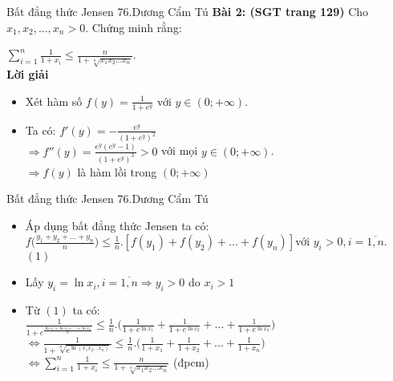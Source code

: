 \begin{frame}{{Bất đẳng thức Jensen} \hspace{6.5cm} 76.Dương Cẩm Tú} 
\textbf{Bài 2: (SGT trang 129)} Cho $x_1,x_2,...,x_n>0$. Chứng minh rằng:\\
\begin{center}
     $\displaystyle \sum_{i=1}^{n} \frac{1}{1+x_i}\leq \frac{n}{1+\sqrt[n]{x_1x_2...x_n}}$.\\
    \pause
    \textbf{Lời giải}\\
\end{center}
\begin{itemize}

    \item Xét hàm số $f(y)=\displaystyle\frac{1}{1+e^y}$ với $y\in (0;+\infty)$.\\
\pause
\vspace{0,25cm}
    \item Ta có: $f'(y)=-\displaystyle\frac{e^y}{(1+e^y)^2}$\\
\pause
\vspace{0,25cm}
    $\Rightarrow \displaystyle f''(y)=\frac{e^y(e^y-1)}{(1+e^y)^3}>0$ với mọi $y\in(0;+\infty)$.\\
\pause
\vspace{0,25cm}
$\Rightarrow \displaystyle f(y)$ là hàm lồi trong $(0;+\infty)$\\

\end{itemize}
\end{frame}
\begin{frame}{{Bất đẳng thức Jensen} \hspace{6.5cm} 76.Dương Cẩm Tú} 
\begin{itemize}
 \item Áp dụng bất đẳng thức Jensen ta có:\\
\pause
\vspace{0,25cm}
 $\displaystyle f\Big( \frac{y_1+y_2+...+y_n}{n}\Big) \leq \frac{1}{n}. [f(y_1)+f(y_2)+...+f(y_n)]$với $y_i>0, i= \overline{1,n}$. $(1)$\\
\item Lấy $y_i=\ln{x_i},i= \overline{1,n} \Rightarrow y_i>0$ do $x_i>1$\\ 
 \item Từ $(1)$ ta có:\\
\pause
\vspace{0,25cm}
$\displaystyle\frac{1}{1+e^{\frac{\ln{x_1}+\ln{x_2}+...+\ln{x_n}}{n}}}\leq \frac{1}{n}.\Big( \frac{1}{1+e^{\ln x_1}}+\frac{1}{1+e^{\ln x_2}}+...+\frac{1}{1+e^{\ln x_n}}\Big)$\\
\pause
\vspace{0,25cm}
$\Leftrightarrow\displaystyle\frac{1}{1+\sqrt[n]{e^{\ln(x_1x_2...x_n)}}}\leq \frac{1}{n}.\Big( \frac{1}{1+x_1} +\frac{1}{1+x_2} +...+ \frac{1}{1+x_n}\Big)$\\
\pause
\vspace{0,25cm}
$\Leftrightarrow \displaystyle \sum_{i=1}^{n} \frac{1}{1+x_i}\leq \frac{n}{1+\sqrt[n]{x_1x_2...x_n}}$ (đpcm)
\end{itemize}
\end{frame}
